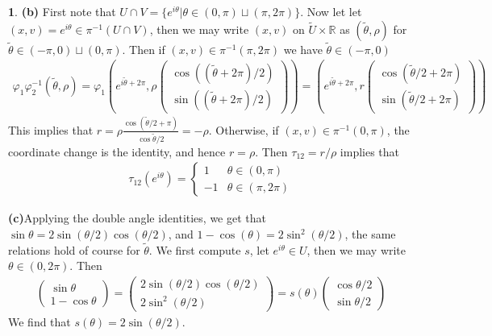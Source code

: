 \documentclass[10.5pt]{article}
\theoremstyle{definition}
\newtheorem{pb}{}
\newcommand{\set}[1]{\{#1\}}
\newcommand{\tth}{\tilde{\theta}}
\begin{document}
\begin{pb}
        \textbf{(b)} First note that \(U \cap V = \set{e^{i\theta}\vert \theta \in (0,\pi)\sqcup(\pi,2\pi)}\). Now let let 
        \((x,v) = e^{i\theta} \in \pi^{-1}(U \cap V)\), then
        we may write \((x,v)\) on \(\tilde{U} \times \mathbb{R}\) as \((\tth,\rho)\) for \(\tth \in (-\pi,0)\sqcup(0,\pi)\). Then if 
        \((x,v) \in \pi^{-1}(\pi,2\pi)\) we have \(\tth \in (-\pi,0)\)
        \begin{align*}
            \varphi_1 \varphi_2^{-1}(\tth,\rho) = \varphi_1\left(e^{i\tth + 2\pi},\rho \begin{pmatrix} \cos((\tth + 2\pi)/2) \\ \sin((\tth + 2\pi)/2) \end{pmatrix}\right)
            = \left(e^{i\tth + 2\pi},r\begin{pmatrix} \cos(\tth/2 + 2\pi) \\ \sin(\tth/2 + 2\pi) \end{pmatrix}\right)
        \end{align*}
        This implies that \(r = \rho \frac{\cos(\tth/2 + \pi)}{\cos\tth/2}  = -\rho\).
        Otherwise, if \((x,v) \in \pi^{-1}(0,\pi)\), the coordinate change is the identity, and hence \(r = \rho\).
        Then \(\tau_{12} = r/\rho\) implies that
        \begin{align*}
            \tau_{12}(e^{i\theta}) = \begin{cases}
                1 & \theta \in (0,\pi) \\
                -1 & \theta \in (\pi,2\pi)
            \end{cases}
        \end{align*}

        \textbf{(c)}Applying the double angle identities, we get that \(\sin\theta = 2\sin(\theta/2)\cos(\theta/2)\), and 
        \(1 - \cos(\theta) = 2\sin^2(\theta/2)\), the same relations hold of course for \(\tth\).
         We first compute \(s\), let \(e^{i\theta} \in U\), then we may write \(\theta \in (0,2\pi)\). Then
        \begin{align*}
            \begin{pmatrix} \sin\theta \\ 1-\cos\theta \end{pmatrix} = \begin{pmatrix} 2\sin(\theta/2)\cos(\theta/2) \\ 2\sin^2(\theta/2) \end{pmatrix} 
            = s(\theta)\begin{pmatrix} \cos\theta/2 \\ \sin\theta/2\end{pmatrix}
        \end{align*}
        We find that \(s(\theta) = 2\sin(\theta/2)\).
        

\end{pb}
\end{document}
